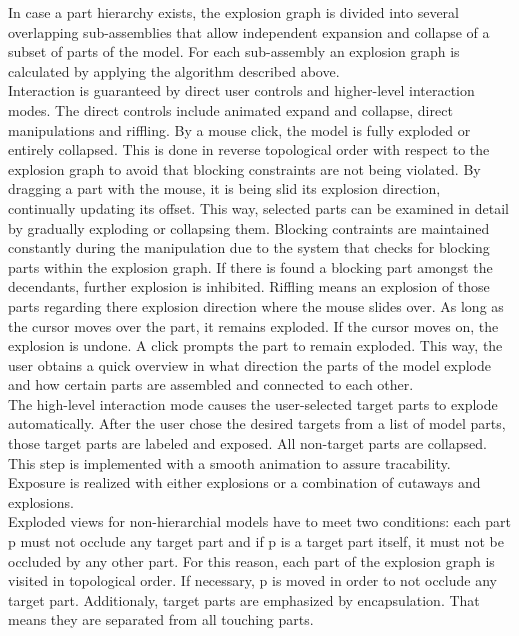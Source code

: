 In case a part hierarchy exists, the explosion graph is divided into several overlapping sub-assemblies that allow independent expansion and collapse of a subset of parts of the model. For each sub-assembly an explosion graph is calculated by applying the algorithm described above.\\
\newline
Interaction is guaranteed by direct user controls and higher-level interaction modes. The direct controls include animated expand and collapse, direct manipulations and riffling. By a mouse click, the model is fully exploded or entirely collapsed. This is done in reverse topological order with respect to the explosion graph to avoid that blocking constraints are not being violated. By dragging a part with the mouse, it is being slid its explosion direction, continually updating its offset. This way, selected parts can be examined in detail by gradually exploding or collapsing them. Blocking contraints are maintained constantly during the manipulation due to the system that checks for blocking parts within the explosion graph. If there is found a blocking part amongst the decendants, further explosion is inhibited. Riffling means an explosion of those parts regarding there explosion direction where the mouse slides over. As long as the cursor moves over the part, it remains exploded. If the cursor moves on, the explosion is undone. A click prompts the part to remain exploded. This way, the user obtains a quick overview in what direction the parts of the model explode and how certain parts are assembled and connected to each other.\\
The high-level interaction mode causes the user-selected target parts to explode automatically. After the user chose the desired targets from a list of model parts, those target parts are labeled and exposed. All non-target parts are collapsed. This step is implemented with a smooth animation to assure tracability. Exposure is realized with either explosions or a combination of cutaways and explosions.\\
Exploded views for non-hierarchial models have to meet two conditions: each part p must not occlude any target part and if p is a target part itself, it must not be occluded by any other part. For this reason, 
each part of the explosion graph is visited in topological order. If necessary, p is moved in order to not occlude any target part. Additionaly, target parts are emphasized by encapsulation. That means they are separated from all touching parts.\\
